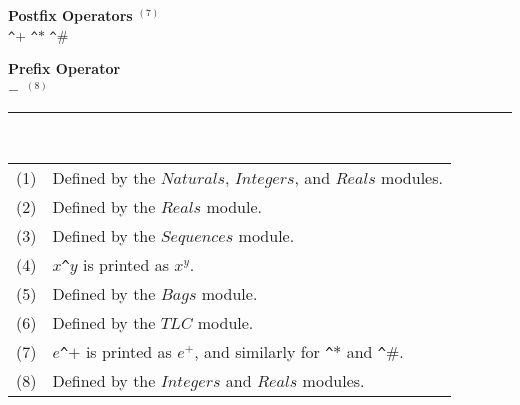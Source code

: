 \documentclass[fleqn,leqno]{article}
\newcommand{\notemark}[1]{\ensuremath{^{(#1)}}}
\begin{document}
\vspace{2\baselineskip}

%
%
%


\noindent
\textbf{Postfix Operators} \notemark{7}\\[.4em]
\verb|^|$+$%
\verb|^|$*$ %
\verb|^|$\#$ 


\vspace{2\baselineskip}

\noindent
\textbf{Prefix Operator}\\[.4em]
$-$\ \notemark{8}

\noindent
\rule{.2\textwidth}{.4pt}\\
{\footnotesize\begin{tabular}[t]{@{}l@{\ }l}
  (1)& Defined by the $Naturals$, $Integers$, and $Reals$ modules.\\[.1em]
  (2)& Defined by the $Reals$ module.\\[.1em]
  (3)& Defined by the $Sequences$ module.\\[.1em]
  (4)& $x$\verb|^|$y$ is printed as $x^{y}$.\\[.1em]
  (5) & Defined by the $Bags$ module.\\[.1em]
  (6) & Defined by the $TLC$ module.\\[.1em]
  (7) & $e$\verb|^|$+$ is printed as $e^{+}$\s{-.2}, and similarly for
        \verb|^|$*$ and \verb|^|$\#$.\\[.1em]
  (8) & Defined by the $Integers$ and $Reals$ modules.
\end{tabular}}
\end{document}
